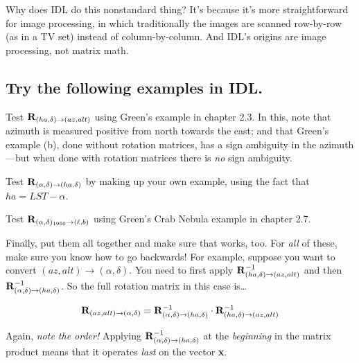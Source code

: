 	Why does IDL do this nonstandard thing? It's because it's more
straightforward for image processing, in which traditionally the images
are scanned row-by-row (as in a TV set) instead of column-by-column. And
IDL's origins are image processing, not matrix math.

\subsection {Try the following examples in IDL.}

	Test ${\bf R}_{(ha, \delta) \rightarrow (az, alt)}$ using
Green's example in chapter 2.3.  In this, note that azimuth is measured
positive from north towards the east; and that Green's example (b), done
without rotation matrices, has a sign ambiguity in the azimuth---but
when done with rotation matrices there is {\it no} sign ambiguity. 

	Test ${\bf R}_{(\alpha, \delta) \rightarrow (ha, \delta)}$ by
making up your own example, using the fact that $ha = LST - \alpha$. 

	Test ${\bf R}_{(\alpha, \delta)_{1950} \rightarrow (\ell, b)}$
using Green's Crab Nebula example in chapter 2.7. 

	Finally, put them all together and make sure that works, too. 
For {\it all} of these, make sure you know how to go backwards! For
example, suppose you want to convert $(az, alt) \rightarrow (\alpha,
\delta)$.  You need to first apply ${\bf R}_{(ha, \delta) \rightarrow
(az, alt)}^{-1}$ and then ${\bf R}_{(\alpha, \delta) \rightarrow (ha,
\delta)}^{-1}$.  So the full rotation matrix in this case is\dots

\begin{equation}
{\bf R}_{(az, alt) \rightarrow (\alpha, \delta)} = 
{\bf R}_{(\alpha, \delta) \rightarrow (ha, \delta)}^{-1} \cdot
{\bf R}_{(ha, \delta) \rightarrow (az, alt)}^{-1}
\end{equation}


\noindent Again, {\it note the order!} Applying ${\bf R}_{(\alpha,
\delta) \rightarrow (ha, \delta)}^{-1}$ at the {\it beginning} in the
matrix product means that it operates {\it last} on the vector {\bf x}. 

\begin{figure}
\end{figure}  

